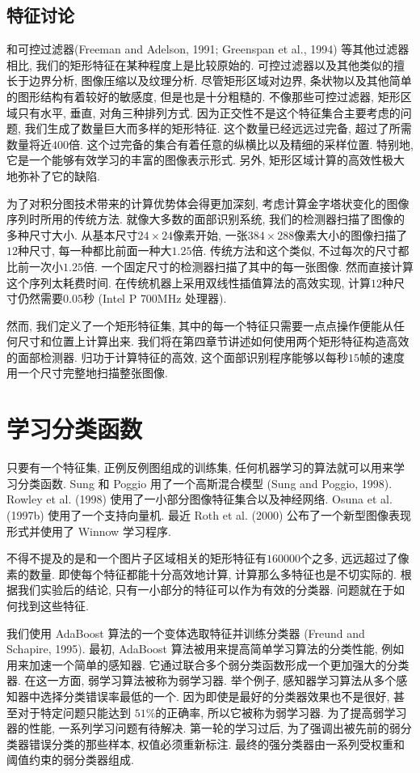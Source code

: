 \documentclass[a4paper,utf8,11pt, onecolumn]{ctexart}
\newcommand{\RN}[1]{%
  \textup{\uppercase\expandafter{\romannumeral#1}}%
}
\begin{document}
\subsection{特征讨论}
和可控过滤器(Freeman and Adelson, 1991; Greenspan et al., 1994) 等其他过滤器相比, 我们的矩形特征在某种程度上是比较原始的. 可控过滤器以及其他类似的擅长于边界分析, 图像压缩以及纹理分析. 
尽管矩形区域对边界, 条状物以及其他简单的图形结构有着较好的敏感度, 但是也是十分粗糙的. 不像那些可控过滤器, 矩形区域只有水平, 垂直, 对角三种排列方式. 因为正交性不是这个特征集合主要考虑的问题, 我们生成了数量巨大而多样的矩形特征. 这个数量已经远远过完备, 超过了所需数量将近$400$倍.
这个过完备的集合有着任意的纵横比以及精细的采样位置. 特别地, 它是一个能够有效学习的丰富的图像表示形式. 另外, 矩形区域计算的高效性极大地弥补了它的缺陷. 

为了对积分图技术带来的计算优势体会得更加深刻, 考虑计算金字塔状变化的图像序列时所用的传统方法. 就像大多数的面部识别系统, 我们的检测器扫描了图像的多种尺寸大小. 从基本尺寸$24\times24$像素开始, 一张$384\times288$像素大小的图像扫描了$12$种尺寸, 每一种都比前面一种大$1.25$倍.
传统方法和这个类似, 不过每次的尺寸都比前一次小$1.25$倍. 一个固定尺寸的检测器扫描了其中的每一张图像. 然而直接计算这个序列太耗费时间. 在传统机器上采用双线性插值算法的高效实现, 计算$12$种尺寸仍然需要$0.05$秒 (Intel P\RN{3} 700MHz 处理器).

然而, 我们定义了一个矩形特征集, 其中的每一个特征只需要一点点操作便能从任何尺寸和位置上计算出来. 我们将在第四章节讲述如何使用两个矩形特征构造高效的面部检测器. 归功于计算特征的高效, 这个面部识别程序能够以每秒$15$帧的速度用一个尺寸完整地扫描整张图像.

\section{学习分类函数}\label{sec:learning}
只要有一个特征集, 正例反例图组成的训练集, 任何机器学习的算法就可以用来学习分类函数. Sung 和 Poggio 用了一个高斯混合模型 (Sung and Poggio, 1998). Rowley et al. (1998) 使用了一小部分图像特征集合以及神经网络. Osuna et al. (1997b) 使用了一个支持向量机. 最近 Roth et al. (2000) 公布了一个新型图像表现形式并使用了 Winnow 学习程序.

不得不提及的是和一个图片子区域相关的矩形特征有$160000$个之多, 远远超过了像素的数量. 即使每个特征都能十分高效地计算, 计算那么多特征也是不切实际的. 根据我们实验后的结论, 只有一小部分的特征可以作为有效的分类器. 问题就在于如何找到这些特征.

我们使用 AdaBoost 算法的一个变体选取特征并训练分类器 (Freund and Schapire, 1995). 最初, AdaBoost 算法被用来提高简单学习算法的分类性能, 例如用来加速一个简单的感知器. 它通过联合多个弱分类函数形成一个更加强大的分类器. 在这一方面, 弱学习算法被称为弱学习器.
举个例子, 感知器学习算法从多个感知器中选择分类错误率最低的一个. 因为即使是最好的分类器效果也不是很好, 甚至对于特定问题只能达到 $51\%$的正确率, 所以它被称为弱学习器.
为了提高弱学习器的性能, 一系列学习问题有待解决. 第一轮的学习过后, 为了强调出被先前的弱分类器错误分类的那些样本, 权值必须重新标注. 最终的强分类器由一系列受权重和阈值约束的弱分类器组成.
\end{document}

